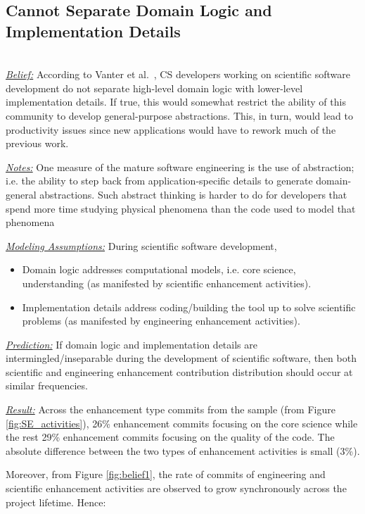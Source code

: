 \documentclass[sigconf,review,anonymous]{acmart}
\newcommand{\bi}{\begin{itemize}}
\newcommand{\ei}{\end{itemize}}
\begin{document}
\subsection{Cannot Separate Domain Logic and Implementation Details}~\\
\noindent \textit{\underline{Belief:}} 
According to Vanter et al.~\cite{faulk09_secs},
CS developers working on scientific software development do not separate high-level domain logic with
lower-level implementation details. If true, this would somewhat restrict the ability
of this community to develop general-purpose abstractions. This, in turn, would lead
to productivity issues since new applications would have to rework much of the previous
work. 


\noindent \textit{\underline{Notes:}} One measure of the mature software engineering is the
use of abstraction; i.e. the ability to step back from application-specific
details to generate domain-general abstractions. Such abstract thinking is harder to do for developers that spend more time studying physical phenomena than the code used to model that phenomena


\noindent \textit{\underline{Modeling Assumptions:}} During scientific software development,
\bi
\item Domain logic addresses computational models, i.e. core science, understanding (as manifested by scientific enhancement activities). 
\item Implementation details address coding/building the tool up to solve scientific problems (as manifested by engineering enhancement activities). 
\ei


\noindent \textit{\underline{Prediction:}} If domain logic and implementation details are intermingled/inseparable during the development of scientific software, then both scientific and engineering enhancement contribution distribution should occur at similar frequencies.

\noindent \textit{\underline{Result:}} Across the enhancement type commits from the sample (from Figure \ref{fig:SE_activities}), 26\% enhancement commits focusing on the core science while the rest 29\% enhancement commits focusing on the quality of the code. The absolute difference between the two types of enhancement activities is small (3\%). 

Moreover, from Figure \ref{fig:belief1}, the rate of commits of engineering and scientific enhancement activities are observed to grow synchronously across the project lifetime. Hence:
\end{document}
